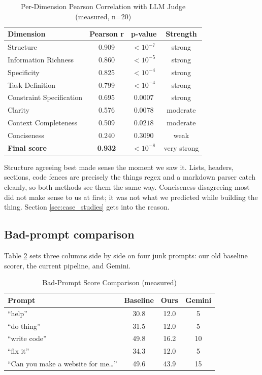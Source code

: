 \documentclass[conference]{IEEEtran}
\begin{document}
\begin{table}[t]
\centering
\caption{Per-Dimension Pearson Correlation with LLM Judge (measured, n=20)}
\label{tab:correlations}
\begin{tabular}{lccc}
\toprule
\textbf{Dimension} & \textbf{Pearson r} & \textbf{p-value} & \textbf{Strength} \\
\midrule
Structure                & 0.909 & $<10^{-7}$ & strong \\
Information Richness     & 0.860 & $<10^{-5}$ & strong \\
Specificity              & 0.825 & $<10^{-4}$ & strong \\
Task Definition          & 0.799 & $<10^{-4}$ & strong \\
Constraint Specification & 0.695 & $0.0007$   & strong \\
Clarity                  & 0.576 & $0.0078$   & moderate \\
Context Completeness     & 0.509 & $0.0218$   & moderate \\
Conciseness              & 0.240 & $0.3090$   & weak \\
\midrule
\textbf{Final score}     & \textbf{0.932} & $<10^{-8}$ & very strong \\
\bottomrule
\end{tabular}
\end{table}

Structure agreeing best made sense the moment we saw it. Lists, headers, sections, code fences are precisely the things regex and a markdown parser catch cleanly, so both methods see them the same way. Conciseness disagreeing most did not make sense to us at first; it was not what we predicted while building the thing. Section \ref{sec:case_studies} gets into the reason.

\subsection{Bad-prompt comparison}
Table \ref{tab:bad} sets three columns side by side on four junk prompts: our old baseline scorer, the current pipeline, and Gemini.

\begin{table}[t]
\centering
\caption{Bad-Prompt Score Comparison (measured)}
\label{tab:bad}
\begin{tabular}{lccc}
\toprule
\textbf{Prompt} & \textbf{Baseline} & \textbf{Ours} & \textbf{Gemini} \\
\midrule
``help''                  & 30.8 & 12.0 & 5  \\
``do thing''              & 31.5 & 12.0 & 5  \\
``write code''            & 49.8 & 16.2 & 10 \\
``fix it''                & 34.3 & 12.0 & 5  \\
``Can you make a website for me\ldots'' & 49.6 & 43.9 & 15 \\
\bottomrule
\end{tabular}
\end{table}
\end{document}
